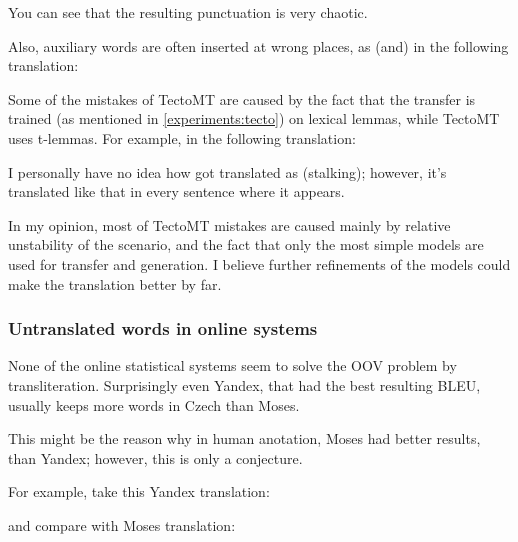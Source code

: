 You can see that the resulting punctuation is very chaotic.

Also, auxiliary words are often inserted at wrong places, as  (and) in the following translation:


Some of the mistakes of TectoMT are caused by the fact that the transfer is trained (as mentioned in \ref{experiments:tecto}) on lexical lemmas, while TectoMT uses t-lemmas. For example, in the following translation:


I personally have no idea how  got translated as  (stalking); however, it's translated like that in every sentence where it appears. 

In my opinion, most of TectoMT mistakes are caused mainly by relative unstability of the scenario, and the fact that only the most simple models are used for transfer and generation. 
I believe further refinements of the models could make the translation better by far.
\subsubsection{Untranslated words in online systems}
None of the online statistical systems seem to solve the OOV problem by transliteration. Surprisingly even Yandex, that had the best resulting BLEU, usually keeps more words in Czech than Moses. 

This might be the reason why in human anotation, Moses had better results, than Yandex; however, this is only a conjecture.

For example, take this Yandex translation:


and compare with Moses translation:

